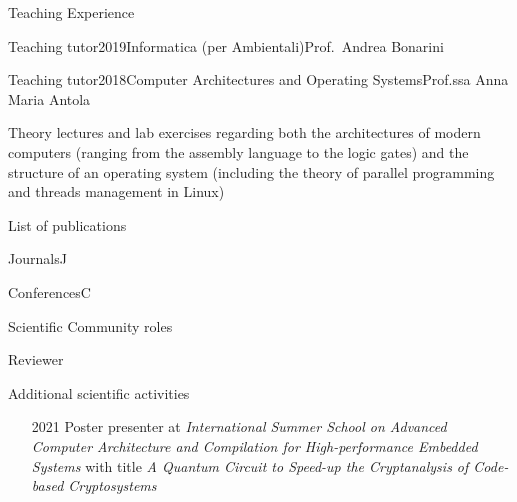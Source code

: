 \documentclass[
	a4paper, %
	11pt, %
]{resume} %
\begin{document}
\begin{rSection}{Teaching Experience}
\begin{rSubsection}{Teaching tutor}{2019}{Informatica (per Ambientali)}{Prof.\ Andrea Bonarini}
\end{rSubsection}
\begin{rSubsection}{Teaching tutor}{2018}{Computer Architectures and Operating Systems}{Prof.ssa Anna Maria Antola}
\item Theory lectures and lab exercises regarding both the architectures of
  modern computers (ranging from the assembly language to the logic gates) and
  the structure of an operating system (including the theory of parallel
  programming and threads management in Linux)
\end{rSubsection}
\end{rSection}
\clearpage
\begin{rSection}{List of publications}
  \begin{tSubPublications}{Journals}{J}
  \item {}
  \end{tSubPublications}
  \begin{tSubPublications}{Conferences}{C}
  \item {}
  \item {}
  \end{tSubPublications}
\end{rSection}
\begin{rSection}{Scientific Community roles}
  \begin{rSubsection}{Reviewer}{}{}{}
  \item {}
  \item {}
  \item {}
  \end{rSubsection}
\end{rSection}
\begin{rSection}{Additional scientific activities}
  \begin{itemize}
  \item[2021] Poster presenter at \emph{International Summer School on Advanced
      Computer Architecture and Compilation for High-performance Embedded
      Systems } with title \emph{A Quantum Circuit to Speed-up the Cryptanalysis
      of Code-based Cryptosystems}
  \end{itemize}
\end{rSection}
\end{document}
